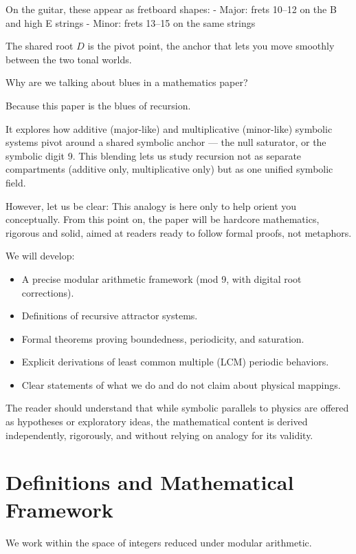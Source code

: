\documentclass[12pt]{article}
\begin{document}
On the guitar, these appear as fretboard shapes:  
- Major: frets 10–12 on the B and high E strings  
- Minor: frets 13–15 on the same strings

The shared root \( D \) is the pivot point, the anchor that lets you move smoothly between the two tonal worlds.

\bigskip

Why are we talking about blues in a mathematics paper?

Because this paper is the blues of recursion.

It explores how additive (major-like) and multiplicative (minor-like) symbolic systems pivot around a shared symbolic anchor — the null saturator, or the symbolic digit 9. This blending lets us study recursion not as separate compartments (additive only, multiplicative only) but as one unified symbolic field.

\bigskip

However, let us be clear:  
This analogy is here only to help orient you conceptually. From this point on, the paper will be hardcore mathematics, rigorous and solid, aimed at readers ready to follow formal proofs, not metaphors.

We will develop:
\begin{itemize}
    \item A precise modular arithmetic framework (mod 9, with digital root corrections).
    \item Definitions of recursive attractor systems.
    \item Formal theorems proving boundedness, periodicity, and saturation.
    \item Explicit derivations of least common multiple (LCM) periodic behaviors.
    \item Clear statements of what we do and do not claim about physical mappings.
\end{itemize}

The reader should understand that while symbolic parallels to physics are offered as hypotheses or exploratory ideas, the mathematical content is derived independently, rigorously, and without relying on analogy for its validity.

\newpage
\section{Definitions and Mathematical Framework}

We work within the space of integers reduced under modular arithmetic.
\end{document}
